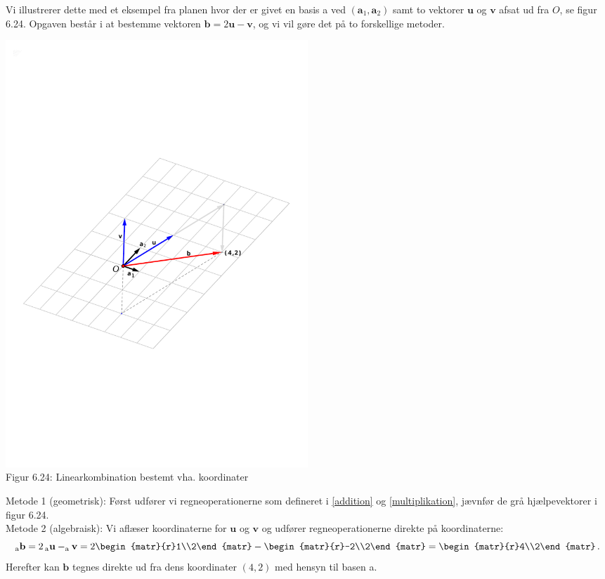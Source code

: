 Vi illustrerer dette med et eksempel fra planen hvor der er givet en basis a ved $(\mathbf a_1,\mathbf a_2)$ samt to vektorer $\mathbf u$ og $\mathbf v$ afsat ud fra $O$, se figur 6.24. Opgaven består i at bestemme vektoren $\mathbf b = 2\mathbf u-\mathbf v$, og vi vil gøre det på to forskellige metoder.

\begin{center}
		\includegraphics[trim=5.5cm 10cm 3.5cm 10cm,width=0.50\textwidth,clip]{geometer/abasis0b.pdf}	
		\\Figur 6.24: Linearkombination bestemt vha. koordinater			
\end{center}
Metode 1 (geometrisk): Først udfører vi regneoperationerne som defineret i \ref{addition} og \ref{multiplikation}, jævnfør de grå hjælpevektorer i figur 6.24. \\

Metode 2 (algebraisk): Vi aflæser koordinaterne for $\mathbf u$ og $\mathbf v$ og udfører regneoperationerne direkte på koordinaterne:
 \begin{equation}
_\mathrm a\mathbf b=2\,_\mathrm a\mathbf u-_\mathrm a\mathbf v=
2\begin{matr}{r}1\\2\end{matr}-\begin{matr}{r}-2\\2\end{matr}=
\begin{matr}{r}4\\2\end{matr}\,.
\end{equation} 
Herefter kan $\mathbf b$ tegnes direkte ud fra dens koordinater $(4,2) $ med hensyn til basen a.\\

